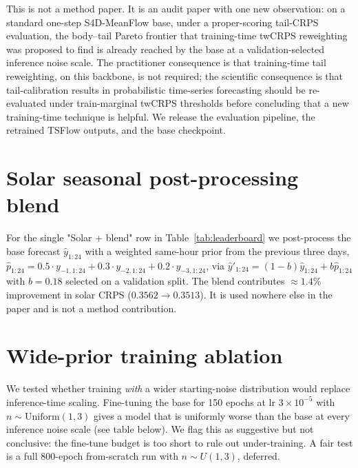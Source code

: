 \documentclass{article}
\begin{document}
This is not a method paper. It is an audit paper with one new
observation: on a standard one-step S4D-MeanFlow base, under a
proper-scoring tail-CRPS evaluation, the body--tail Pareto frontier
that training-time twCRPS reweighting was proposed to find is
already reached by the base at a validation-selected inference noise
scale. The practitioner consequence is that training-time tail
reweighting, on this backbone, is not required; the scientific
consequence is that tail-calibration results in
probabilistic time-series forecasting should be re-evaluated under
train-marginal twCRPS thresholds before concluding that a new
training-time technique is helpful. We release the evaluation
pipeline, the retrained TSFlow outputs, and the base checkpoint.

\appendix

\section{Solar seasonal post-processing blend}
\label{app:blend}

For the single "Solar + blend" row in Table~\ref{tab:leaderboard}
we post-process the base forecast $\hat{y}_{1:24}$ with a
weighted same-hour prior from the previous three days,
$\hat{p}_{1:24} = 0.5 \cdot y_{-1,1:24} + 0.3 \cdot y_{-2,1:24} + 0.2 \cdot y_{-3,1:24}$,
via $\hat{y}'_{1:24} = (1-b)\hat{y}_{1:24} + b\hat{p}_{1:24}$ with
$b = 0.18$ selected on a validation split. The blend contributes
$\approx 1.4\%$ improvement in solar CRPS ($0.3562 \to 0.3513$). It
is used nowhere else in the paper and is not a method contribution.

\section{Wide-prior training ablation}
\label{app:wideprior}

We tested whether training \emph{with} a wider starting-noise
distribution would replace inference-time scaling. Fine-tuning the
base for 150 epochs at lr $3\times 10^{-5}$ with $n \sim \mathrm{Uniform}(1,3)$
gives a model that is uniformly worse than the base at every
inference noise scale (see table below). We flag this as suggestive
but not conclusive: the fine-tune budget is too short to rule out
under-training. A fair test is a full $800$-epoch from-scratch run
with $n \sim U(1,3)$, deferred.
\end{document}
